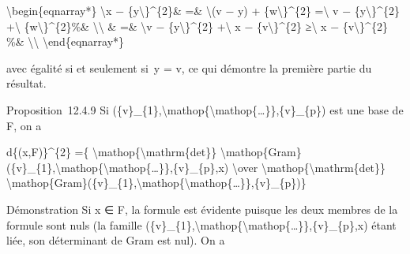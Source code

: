 \documentclass[]{article}
\begin{document}
\textbackslash{}begin\{eqnarray*\} \textbackslash{}\textbar{}x −
\{y\textbackslash{}\textbar{}\}\^{}\{2\}\& =\&
\textbackslash{}\textbar{}(v − y) +
\{w\textbackslash{}\textbar{}\}\^{}\{2\} =\textbackslash{}\textbar{} v −
\{y\textbackslash{}\textbar{}\}\^{}\{2\} +\textbackslash{}\textbar{}
\{w\textbackslash{}\textbar{}\}\^{}\{2\}\%\&
\textbackslash{}\textbackslash{} \& =\& \textbackslash{}\textbar{}v −
\{y\textbackslash{}\textbar{}\}\^{}\{2\} +\textbackslash{}\textbar{} x −
\{v\textbackslash{}\textbar{}\}\^{}\{2\} ≥\textbackslash{}\textbar{} x −
\{v\textbackslash{}\textbar{}\}\^{}\{2\} \%\&
\textbackslash{}\textbackslash{} \textbackslash{}end\{eqnarray*\}

avec égalité si et seulement si~y = v, ce qui démontre la première
partie du résultat.

Proposition~12.4.9 Si
(\{v\}\_\{1\},\textbackslash{}mathop\{\textbackslash{}mathop\{\ldots{}\}\},\{v\}\_\{p\})
est une base de F, on a

d\{(x,F)\}\^{}\{2\} =\{
\textbackslash{}mathop\{\textbackslash{}mathrm\{det\}\}
\textbackslash{}mathop\{Gram\}(\{v\}\_\{1\},\textbackslash{}mathop\{\textbackslash{}mathop\{\ldots{}\}\},\{v\}\_\{p\},x)
\textbackslash{}over
\textbackslash{}mathop\{\textbackslash{}mathrm\{det\}\}
\textbackslash{}mathop\{Gram\}(\{v\}\_\{1\},\textbackslash{}mathop\{\textbackslash{}mathop\{\ldots{}\}\},\{v\}\_\{p\})\}

Démonstration Si x ∈ F, la formule est évidente puisque les deux membres
de la formule sont nuls (la famille
(\{v\}\_\{1\},\textbackslash{}mathop\{\textbackslash{}mathop\{\ldots{}\}\},\{v\}\_\{p\},x)
étant liée, son déterminant de Gram est nul). On a
\end{document}
